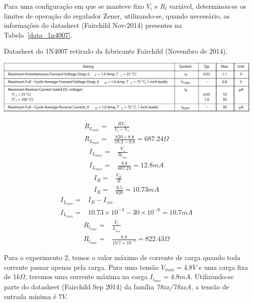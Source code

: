\documentclass[12pt,a4paper]{article}
\begin{document}
Para uma configuração em que se manteve fixo $V_i$ e $R_l$ variável, determinou-se os limites de operação do regulador Zener, utilizando-se, quando necessário, as informações do datasheet (Fairchild Nov-2014) presentes na Tabela~\ref{data_1n4007}.
\begin{table}[htpb]
  \centering
  \caption{Datasheet do 1N4007 retirado da fabricante Fairchild (Novembro de 2014).}
  \label{data_1n4007}
  \includegraphics[width=\linewidth]{1n4007.pdf}
\end{table}
\begin{align}
  R_{L_{min} }=&  \frac{R V_{z}}{V_i - V_{z}}\\ \nonumber
  R_{L_{min} }=&  \frac{820 \times 8.8}{19.3-8.8} = 687.24 \Omega 
\end{align}
\begin{align}
  I_{L_{max} }=&  \frac{V_{z}}{R_{l_{min}}}\\ \nonumber
  I_{L_{max} }=&  \frac{8.8}{687.24} = 12.8 mA
\end{align}
\begin{align}
  I_{R}=&  \frac{V_{R}}{R}\\ \nonumber
  I_{R}=&  \frac{8.5}{820}= 10.73 mA
\end{align}
\begin{align}
  I_{L_{min} }=&  I_R - I_{zm}\\\nonumber
  I_{L_{min} }=&  10.73 \times 10^{-3}- 30 \times 10^{-6}= 10.7 mA 
\end{align}
\begin{align}
  R_{l_{max}} =&\frac{V_{z}}{I_{l_{min}}} \\ \nonumber
  R_{l_{max}} =&\frac{8.8}{10.7 \times 10^{-3}} = 822.43 \Omega 
\end{align}

Para o experimento 2, temos o valor máximo de corrente de carga quando toda corrente passar apenas pela carga. Para uma tensão $V_{max}=4.8 V$ e uma carga fixa de $1 k\Omega$, teremos uma corrente máxima na carga $I_{l_{max}}=4.8 mA$. Utilizando-se parte do datasheet (Fairchild Sep 2014) da família \emph{78xx/78xxA}, a tensão de entrada mínima é $7V$.
\end{document}
